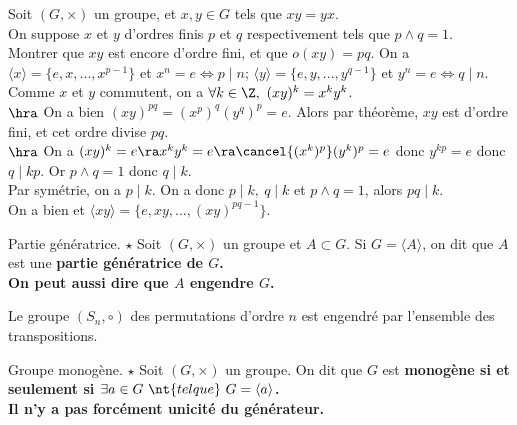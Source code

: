 \documentclass[11pt]{article}
\begin{document}
\begin{ex}{}{}
    Soit $(G,\times)$ un groupe, et $x,y\in G$ tels que $xy=yx$.\\
    On suppose $x$ et $y$ d'ordres finis $p$ et $q$ respectivement tels que $p\land q = 1$.\\
    Montrer que $xy$ est encore d'ordre fini, et que $o(xy)=pq$.
    \tcblower
    On a $\langle x \rangle = \{e,x,...,x^{p-1}\}$ et $x^n=e\iff p\mid n$; $\langle y \rangle = \{e,y,...,y^{q-1}\}$ et $y^n=e\iff q\mid n$.\\
    Comme $x$ et $y$ commutent, on a $\forall k \in \Z, ~ (xy)^k=x^ky^k$.\\
    $\hra$ On a bien $(xy)^{pq}=(x^p)^q(y^q)^p=e$. Alors par théorème, $xy$ est d'ordre fini, et cet ordre divise $pq$.\\
    $\hra$ On a $(xy)^k=e\ra x^ky^k=e \ra \cancel{(x^k)^p}(y^k)^p=e$ donc $y^{kp}=e$ donc $q \mid kp$. Or $p\land q=1$ donc $q\mid k$.\\
    Par symétrie, on a $p\mid k$. On a donc $p\mid k, ~ q \mid k$ et $p\land q=1$, alors $pq\mid k$.\\
    On a bien  et $\langle xy \rangle = \{e,xy,...,(xy)^{pq-1}\}$.
\end{ex}

\vspace*{-0.8cm}

\begin{defi}{Partie génératrice. $\star$}{}
    Soit $(G,\times)$ un groupe et $A\subset G$. Si $G=\langle A \rangle$, on dit que $A$ est une \bf{partie génératrice} de $G$.\\
    On peut aussi dire que $A$ \bf{engendre} $G$.
\end{defi}

\vspace*{-0.8cm}

\begin{ex}{}{}
    Le groupe $(S_n,\circ)$ des permutations d'ordre $n$ est engendré par l'ensemble des transpositions.
\end{ex}

\vspace*{-0.8cm}

\begin{defi}{Groupe monogène. $\star$}{}
    Soit $(G,\times)$ un groupe. On dit que $G$ est \bf{monogène} si et seulement si $\exists a \in G ~\nt{tel que}~ G = \langle a \rangle$.\\
    \warning Il n'y a pas forcément unicité du générateur.
\end{defi}
\end{document}

